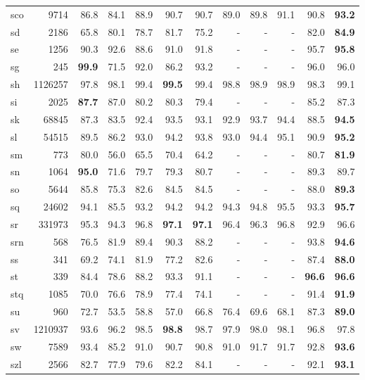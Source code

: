 \documentclass[11pt,a4paper]{article}
\begin{document}
\begin{supertabular}{lrrr|rrr|rrr|rr}
sco & 9714 & 86.8 & 84.1 & 88.9 & 90.7 & 90.7 & 89.0 & 89.8 & 91.1 & 90.8 & \textbf{93.2}\\
sd & 2186 & 65.8 & 80.1 & 78.7 & 81.7 & 75.2 & - & - & - & 82.0 & \textbf{84.9}\\
se & 1256 & 90.3 & 92.6 & 88.6 & 91.0 & 91.8 & - & - & - & 95.7 & \textbf{95.8}\\
sg & 245 & \textbf{99.9} & 71.5 & 92.0 & 86.2 & 93.2 & - & - & - & 96.0 & 96.0\\
sh & 1126257 & 97.8 & 98.1 & 99.4 & \textbf{99.5} & 99.4 & 98.8 & 98.9 & 98.9 & 98.3 & 99.1\\
si & 2025 & \textbf{87.7} & 87.0 & 80.2 & 80.3 & 79.4 & - & - & - & 85.2 & 87.3\\
sk & 68845 & 87.3 & 83.5 & 92.4 & 93.5 & 93.1 & 92.9 & 93.7 & 94.4 & 88.5 & \textbf{94.5}\\
sl & 54515 & 89.5 & 86.2 & 93.0 & 94.2 & 93.8 & 93.0 & 94.4 & 95.1 & 90.9 & \textbf{95.2}\\
sm & 773 & 80.0 & 56.0 & 65.5 & 70.4 & 64.2 & - & - & - & 80.7 & \textbf{81.9}\\
sn & 1064 & \textbf{95.0} & 71.6 & 79.7 & 79.3 & 80.7 & - & - & - & 89.3 & 89.7\\
so & 5644 & 85.8 & 75.3 & 82.6 & 84.5 & 84.5 & - & - & - & 88.0 & \textbf{89.3}\\
sq & 24602 & 94.1 & 85.5 & 93.2 & 94.2 & 94.2 & 94.3 & 94.8 & 95.5 & 93.3 & \textbf{95.7}\\
sr & 331973 & 95.3 & 94.3 & 96.8 & \textbf{97.1} & \textbf{97.1} & 96.4 & 96.3 & 96.8 & 92.9 & 96.6\\
srn & 568 & 76.5 & 81.9 & 89.4 & 90.3 & 88.2 & - & - & - & 93.8 & \textbf{94.6}\\
ss & 341 & 69.2 & 74.1 & 81.9 & 77.2 & 82.6 & - & - & - & 87.4 & \textbf{88.0}\\
st & 339 & 84.4 & 78.6 & 88.2 & 93.3 & 91.1 & - & - & - & \textbf{96.6} & \textbf{96.6}\\
stq & 1085 & 70.0 & 76.6 & 78.9 & 77.4 & 74.1 & - & - & - & 91.4 & \textbf{91.9}\\
su & 960 & 72.7 & 53.5 & 58.8 & 57.0 & 66.8 & 76.4 & 69.6 & 68.1 & 87.3 & \textbf{89.0}\\
sv & 1210937 & 93.6 & 96.2 & 98.5 & \textbf{98.8} & 98.7 & 97.9 & 98.0 & 98.1 & 96.8 & 97.8\\
sw & 7589 & 93.4 & 85.2 & 91.0 & 90.7 & 90.8 & 91.0 & 91.7 & 91.7 & 92.8 & \textbf{93.6}\\
szl & 2566 & 82.7 & 77.9 & 79.6 & 82.2 & 84.1 & - & - & - & 92.1 & \textbf{93.1}\\

\end{supertabular}
\end{document}
